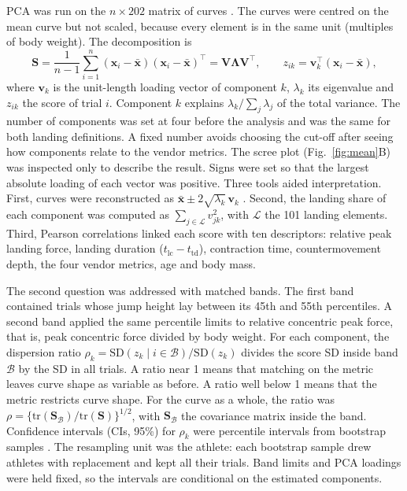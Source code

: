 PCA was run on the $n \times 202$ matrix of curves \parencite{jolliffe2002,jolliffe2016}. The curves were centred on the mean curve but not scaled, because every element is in the same unit (multiples of body weight). The decomposition is
\begin{equation}
\mathbf{S} = \frac{1}{n-1}\sum_{i=1}^{n}(\mathbf{x}_i - \bar{\mathbf{x}})(\mathbf{x}_i - \bar{\mathbf{x}})^{\top} = \mathbf{V}\boldsymbol{\Lambda}\mathbf{V}^{\top},
\qquad
z_{ik} = \mathbf{v}_k^{\top}(\mathbf{x}_i - \bar{\mathbf{x}}),
\end{equation}
where $\mathbf{v}_k$ is the unit-length loading vector of component $k$, $\lambda_k$ its eigenvalue and $z_{ik}$ the score of trial $i$. Component $k$ explains $\lambda_k / \sum_j \lambda_j$ of the total variance. The number of components was set at four before the analysis and was the same for both landing definitions. A fixed number avoids choosing the cut-off after seeing how components relate to the vendor metrics. The scree plot (Fig.~\ref{fig:mean}B) was inspected only to describe the result. Signs were set so that the largest absolute loading of each vector was positive. Three tools aided interpretation. First, curves were reconstructed as $\bar{\mathbf{x}} \pm 2\sqrt{\lambda_k}\,\mathbf{v}_k$ \parencite{brandon2013,warmenhoven2019}. Second, the landing share of each component was computed as $\sum_{j \in \mathcal{L}} v_{jk}^2$, with $\mathcal{L}$ the 101 landing elements. Third, Pearson correlations linked each score with ten descriptors: relative peak landing force, landing duration ($t_{\mathrm{lc}} - t_{\mathrm{td}}$), contraction time, countermovement depth, the four vendor metrics, age and body mass.

The second question was addressed with matched bands. The first band contained trials whose jump height lay between its 45th and 55th percentiles. A second band applied the same percentile limits to relative concentric peak force, that is, peak concentric force divided by body weight. For each component, the dispersion ratio $\rho_k = \mathrm{SD}(z_{k} \mid i \in \mathcal{B}) / \mathrm{SD}(z_{k})$ divides the score SD inside band $\mathcal{B}$ by the SD in all trials. A ratio near 1 means that matching on the metric leaves curve shape as variable as before. A ratio well below 1 means that the metric restricts curve shape. For the curve as a whole, the ratio was $\rho = \{\mathrm{tr}(\mathbf{S}_{\mathcal{B}})/\mathrm{tr}(\mathbf{S})\}^{1/2}$, with $\mathbf{S}_{\mathcal{B}}$ the covariance matrix inside the band. Confidence intervals (CIs, 95\%) for $\rho_k$ were percentile intervals from \nBoot{} bootstrap samples \parencite{efron1993}. The resampling unit was the athlete: each bootstrap sample drew athletes with replacement and kept all their trials. Band limits and PCA loadings were held fixed, so the intervals are conditional on the estimated components.


